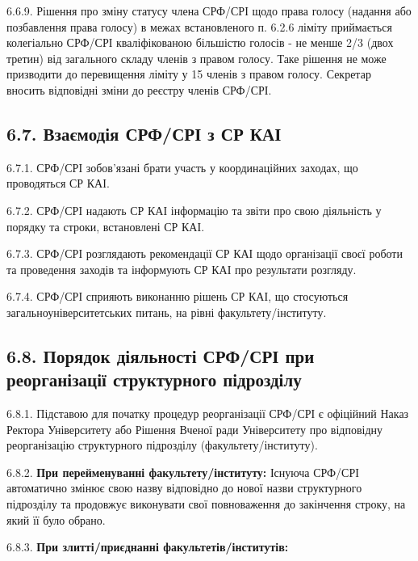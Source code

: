     6.6.9. Рішення про зміну статусу члена СРФ/СРІ щодо права голосу (надання або позбавлення права голосу) в межах встановленого п. 6.2.6 ліміту приймається колегіально СРФ/СРІ кваліфікованою більшістю голосів - не менше 2/3 (двох третин) від загального складу членів з правом голосу. Таке рішення не може призводити до перевищення ліміту у 15 членів з правом голосу. Секретар вносить відповідні зміни до реєстру членів СРФ/СРІ.

\subsection*{6.7. Взаємодія СРФ/СРІ з СР КАІ}
    6.7.1. СРФ/СРІ зобов'язані брати участь у координаційних заходах, що проводяться СР КАІ.

    6.7.2. СРФ/СРІ надають СР КАІ інформацію та звіти про свою діяльність у порядку та строки, встановлені СР КАІ.

    6.7.3. СРФ/СРІ розглядають рекомендації СР КАІ щодо організації своєї роботи та проведення заходів та інформують СР КАІ про результати розгляду.

    6.7.4. СРФ/СРІ сприяють виконанню рішень СР КАІ, що стосуються загальноуніверситетських питань, на рівні факультету/інституту.

\subsection*{6.8. Порядок діяльності СРФ/СРІ при реорганізації структурного підрозділу}
    6.8.1. Підставою для початку процедур реорганізації СРФ/СРІ є офіційний Наказ Ректора Університету або Рішення Вченої ради Університету про відповідну реорганізацію структурного підрозділу (факультету/інституту).

    6.8.2. \textbf{При перейменуванні факультету/інституту:} Існуюча СРФ/СРІ автоматично змінює свою назву відповідно до нової назви структурного підрозділу та продовжує виконувати свої повноваження до закінчення строку, на який її було обрано.

    6.8.3. \textbf{При злитті/приєднанні факультетів/інститутів:}

